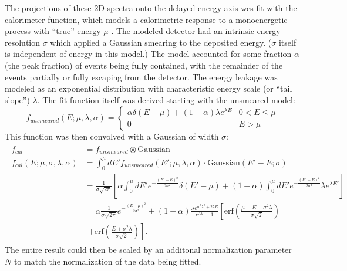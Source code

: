 The projections of these 2D spectra onto the delayed energy axis
wes fit with the calorimeter function, which models
a calorimetric response to a monoenergetic process with ``true''
energy $\mu$ \cite{calorimeter2016}.
The modeled detector had an intrinsic energy resolution $\sigma$
which applied a Gaussian smearing to the deposited energy.
($\sigma$ itself is independent of energy in this model.)
The model accounted for some fraction $\alpha$ (the peak fraction)
of events being fully contained,
with the remainder of the events partially or fully escaping from the detector.
The energy leakage was modeled as an exponential distribution
with characteristic energy scale (or ``tail slope'') $\lambda$.
The fit function itself was derived starting with
the unsmeared model:
\begin{equation}
    f_{unsmeared}(E;\mu,\lambda,\alpha) =
    \begin{cases}
        \alpha\delta(E-\mu) + (1-\alpha)\lambda e^{\lambda E}
        & 0 < E \leq \mu \\
        0 & E > \mu
    \end{cases}
\end{equation}
This function was then convolved with a Gaussian
of width $\sigma$:
\begin{align}
    \begin{split}
    f_{cal}    &= f_{unsmeared} \otimes \text{Gaussian} \\
    f_{cal}(E;\mu,\sigma,\lambda,\alpha) &= \int_0^\mu dE'
    f_{unsmeared}(E';\mu,\lambda,\alpha) \cdot \text{Gaussian}(E'-E; \sigma) \\
               &= \frac{1}{\sigma\sqrt{2\pi}}
               \left[
                   \alpha\int_0^\mu dE' e^{-\frac{(E'-E)^2}{2\sigma^2}} \delta(E'-\mu)
                   + (1-\alpha)\int_0^\mu dE' e^{-\frac{(E'-E)^2}{2\sigma^2}}
                   \lambda e^{\lambda E'}
               \right] \\
               &= \alpha\frac{1}{\sigma\sqrt{2\pi}}e^{-\frac{(E-\mu)^2}{2\sigma^2}}
               + (1-\alpha)
               \frac{\lambda e^{\sigma^2\lambda^2+2\lambda E}}{e^{\lambda\mu}-1}
               \left[
                   \text{erf}
                   \left(
                       \frac{\mu-E-\sigma^2\lambda}{\sigma\sqrt{2}}
                   \right)
                   \right. \\
               &\ \ \left.
                   + \text{erf}
                   \left(
                       \frac{E + \sigma^2\lambda}{\sigma\sqrt{2}}
                   \right)
               \right].
    \end{split}
\end{align}
The entire result could then be scaled
by an additonal normalization parameter $N$
to match the normalization of the data being fitted.

